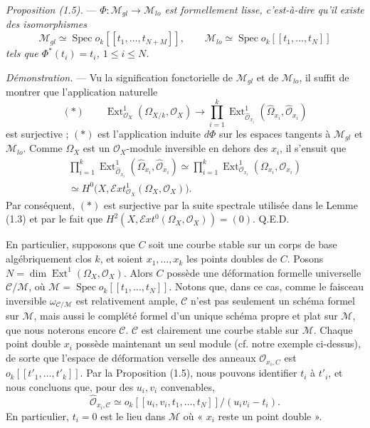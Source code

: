 \documentclass[10pt]{article}
\newcommand{\Spec}{\operatorname{Spec}}
\newcommand{\Ext}{\operatorname{Ext}}
\newcommand{\cO}{\mathcal O}
\newcommand{\cM}{\mathcal M}
\newcommand{\cC}{\mathcal C}
\newcommand{\QED}{\hfill Q.E.D.}
\begin{document}
\medskip
\noindent\emph{Proposition (1.5).} --- \emph{$\Phi:\cM_{gl}\to\cM_{lo}$ est formellement lisse, c'est-à-dire qu'il existe des isomorphismes}
\[
\cM_{gl}\simeq\Spec o_k[[t_1,\ldots,t_{N+M}]],\qquad
\cM_{lo}\simeq\Spec o_k[[t_1,\ldots,t_N]]
\]
\emph{tels que $\Phi^*(t_i)=t_i$, $1\leq i\leq N$.}


\noindent\emph{Démonstration.} --- Vu la signification fonctorielle de $\cM_{gl}$ et de $\cM_{lo}$, il suffit de montrer que l'application naturelle
\[
(*)\qquad \Ext^1_{\cO_X}(\Omega_{X/k},\cO_X)\longrightarrow \prod_{i=1}^{k}\Ext^1_{\widehat{\cO}_{x_i}}(\widehat{\Omega}_{x_i},\widehat{\cO}_{x_i})
\]
est surjective ; $(*)$ est l'application induite $d\Phi$ sur les espaces tangents à $\cM_{gl}$ et $\cM_{lo}$. Comme $\Omega_X$ est un $\cO_X$-module inversible en dehors des $x_i$, il s'ensuit que
\[
\begin{gathered}
\prod_{i=1}^{k}\Ext^1_{\widehat{\cO}_{x_i}}(\widehat{\Omega}_{x_i},\widehat{\cO}_{x_i})
\simeq\prod_{i=1}^{k}\Ext^1_{\cO_{x_i}}(\Omega_{x_i},\cO_{x_i})\\
\simeq H^0\bigl(X,\mathcal{E}xt^1_{\cO_X}(\Omega_X,\cO_X)\bigr).
\end{gathered}
\]
Par conséquent, $(*)$ est surjective par la suite spectrale utilisée dans le Lemme (1.3) et par le fait que $H^2(X,\mathcal{E}xt^0(\Omega_X,\cO_X))=(0)$. \QED

En particulier, supposons que $C$ soit une courbe stable sur un corps de base algébriquement clos $k$, et soient $x_1,\ldots,x_k$ les points doubles de $C$. Posons $N=\dim\Ext^1(\Omega_X,\cO_X)$. Alors $C$ possède une déformation formelle universelle $\cC/\cM$, où $\cM=\Spec o_k[[t_1,\ldots,t_N]]$. Notons que, dans ce cas, comme le faisceau inversible $\omega_{\cC/\cM}$ est relativement ample, $\cC$ n'est pas seulement un schéma formel sur $\cM$, mais aussi le complété formel d'un unique schéma propre et plat sur $\cM$, que nous noterons encore $\cC$. $\cC$ est clairement une courbe stable sur $\cM$. Chaque point double $x_i$ possède maintenant un seul module (cf. notre exemple ci-dessus), de sorte que l'espace de déformation verselle des anneaux $\cO_{x_i,C}$ est $o_k[[t'_1,\ldots,t'_k]]$. Par la Proposition (1.5), nous pouvons identifier $t_i$ à $t'_i$, et nous concluons que, pour des $u_i,v_i$ convenables,
\[
\widehat{\cO}_{x_i,\cC}\simeq o_k[[u_i,v_i,t_1,\ldots,t_N]]/(u_i v_i-t_i).
\]
En particulier, $t_i=0$ est le lieu dans $\cM$ où « $x_i$ reste un point double ».
\end{document}
